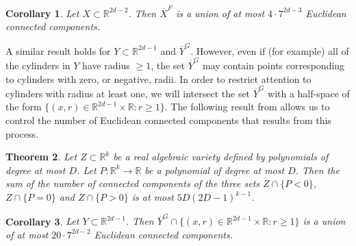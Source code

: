 \documentclass[letterpaper, reqno, 11pt]{article}
\numberwithin{equation}{section}
\newcommand{\RR}{\mathbb{R}}
\newtheorem{thm}{Theorem}[section]
\newtheorem{cor}[thm]{Corollary}
\theoremstyle{remark}
\begin{document}
%
\begin{cor}\label{consequenceOfMilnorThom}
Let $X\subset\RR^{2d-2}$. Then $\overline X^F$ is a union of at most $4\cdot 7^{2d-3}$ Euclidean connected components.%
\end{cor}

A similar result holds for $Y\subset\RR^{2d-1}$ and $\overline Y^{G}$. However, even if (for example) all of the cylinders in $Y$ have radius $\geq 1$, the set $\overline Y^{G}$ may contain points corresponding to cylinders with zero, or negative, radii. In order to restrict attention to cylinders with radius at least one, we will intersect the set  $\overline Y^{G}$ with a half-space of the form $\{(x,r)\in\RR^{2d-1}\times\RR\colon r \geq 1\}$. The following result from \cite{BPR} allows us to control the number of Euclidean connected components that results from this process.

\begin{thm}
Let $Z \subset\RR^k$ be a real algebraic variety defined by polynomials of degree at most $D$. Let $P\colon\RR^k\to\RR$ be a polynomial of degree at most $D$. Then the sum of the number of connected components of the three sets $Z\cap\{P<0\}$, $Z\cap\{P=0\}$ and $Z\cap\{P>0\}$ is at most $5D(2D-1)^{k-1}$.
\end{thm}
\begin{cor}\label{consequenceOfBPR}
Let $Y\subset\RR^{2d-1}$. Then $\overline Y^G \cap \{(x,r)\in\RR^{2d-1}\times\RR\colon r \geq 1\}$ is a union of at most $20\cdot 7^{2d-2}$ Euclidean connected components.
\end{cor}



\end{document}
